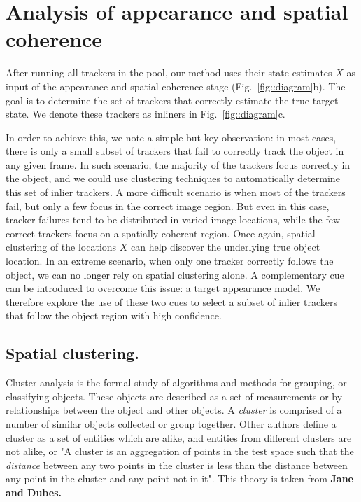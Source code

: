 \section{Analysis of appearance and spatial coherence}
After running all trackers in the pool, our method uses their state estimates
$X$ as input of the appearance and spatial coherence stage
(Fig.~\ref{fig::diagram}b). The goal is to determine the set of
trackers that correctly estimate the true target state. We denote these trackers
as inliners in Fig.~\ref{fig::diagram}c.

In order to achieve this, we note a simple but key observation: in most cases,
there is only a small subset of trackers that fail to correctly track the
object in any given frame.
In such scenario, the majority of the trackers focus correctly in the object,
and we could use clustering techniques to automatically determine this set
of inlier trackers.
A more difficult scenario is when most of the trackers fail, but only a few
focus in the correct image region. But even in this case, tracker failures
tend to be distributed in varied image locations, while the few correct
trackers focus on a spatially coherent region. Once again, spatial clustering
of the locations $X$ can help discover the underlying true object location.
In an extreme scenario, when only one tracker correctly follows the object,
we can no longer rely on spatial clustering alone.
A complementary cue can be introduced to overcome this issue: a target
appearance model. We therefore explore the use of these two cues
to select a subset of inlier trackers that follow the object region with
high confidence.


\subsection{Spatial clustering.}

Cluster analysis is the formal study of algorithms and methods for grouping, or
classifying objects. These objects are described as a set of measurements or by
relationships between the object and other objects. A \textit{cluster} is
comprised of a number of similar objects collected or group together. Other
authors define a cluster as a set of entities which are alike, and entities from
different clusters are not alike, or "A cluster is an aggregation of points in
the test space such that the \textit{distance} between any two points in the
cluster is less than the distance between any point in the cluster and any point
not in it". This theory is taken from \textbf{Jane and Dubes.}

